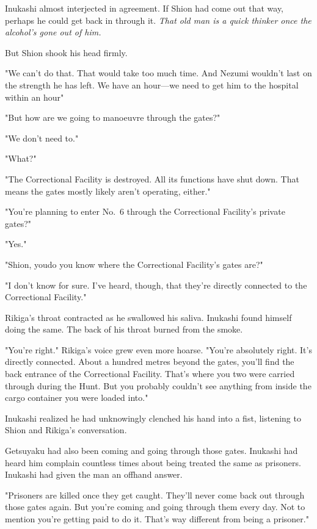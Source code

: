 Inukashi almost interjected in agreement. If Shion had come out that
way, perhaps he could get back in through it. \emph{That old man is a quick
thinker once the alcohol's gone out of him.}

But Shion shook his head firmly.

"We can't do that. That would take too much time. And Nezumi wouldn't
last on the strength he has left. We have an hour---we need to get him to
the hospital within an hour\el "

"But how are we going to manoeuvre through the gates?"

"We don't need to."

"What?"

"The Correctional Facility is destroyed. All its functions have shut
down. That means the gates mostly likely aren't operating, either."

"You're planning to enter No.~6 through the Correctional Facility's
private gates?"

"Yes."

"Shion, you\el do you know where the Correctional Facility's gates are?"

"I don't know for sure. I've heard, though, that they're directly
connected to the Correctional Facility."

Rikiga's throat contracted as he swallowed his saliva. Inukashi found
himself doing the same. The back of his throat burned from the smoke.

"You're right." Rikiga's voice grew even more hoarse. "You're absolutely
right. It's directly connected. About a hundred metres beyond the gates,
you'll find the back entrance of the Correctional Facility. That's where
you two were carried through during the Hunt. But you probably couldn't
see anything from inside the cargo container you were loaded into."

Inukashi realized he had unknowingly clenched his hand into a fist,
listening to Shion and Rikiga's conversation.

Getsuyaku had also been coming and going through those gates. Inukashi
had heard him complain countless times about being treated the same as
prisoners. Inukashi had given the man an offhand answer.

"Prisoners are killed once they get caught. They'll never come back out
through those gates again. But you're coming and going through them
every day. Not to mention you're getting paid to do it. That's way
different from being a prisoner."

